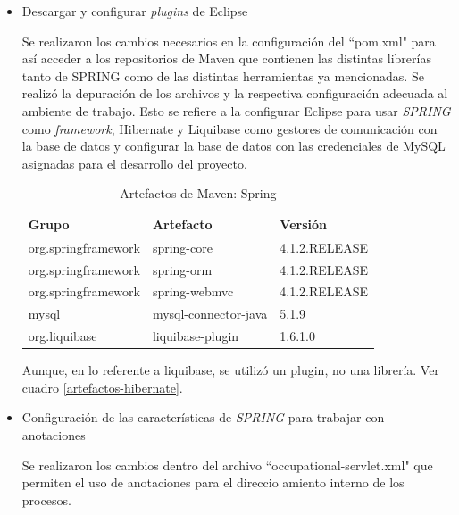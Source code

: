 \begin{enumerate}
\begin{itemize}
           \item Descargar y configurar \textit{plugins} de Eclipse
           
           Se realizaron los cambios necesarios en la configuración del ``pom.xml" para así acceder a los repositorios de Maven que contienen las distintas librerías tanto de SPRING como de las distintas herramientas ya mencionadas. Se realizó la depuración de los archivos y la respectiva configuración adecuada al ambiente de trabajo. Esto se refiere a la configurar Eclipse para usar \textit{SPRING} como \textit{framework}, Hibernate y Liquibase como gestores de comunicación con la base de datos y configurar la base de datos con las credenciales de MySQL asignadas para el desarrollo del proyecto.
           
           \begin{table}[h!]
               
               \begin{center}
                   \begin{tabular}{|l|l|l|}\hline
                       Grupo & Artefacto & Versión \\\hline
                       org.springframework & spring-core & 4.1.2.RELEASE \\\hline
                       org.springframework & spring-orm & 4.1.2.RELEASE \\\hline
                       org.springframework & spring-webmvc & 4.1.2.RELEASE \\\hline
                       mysql & mysql-connector-java & 5.1.9 \\\hline
                       org.liquibase & liquibase-plugin & 1.6.1.0 \\\hline
                    \end{tabular}
                \end{center}
                
                \caption{Artefactos de Maven: Spring}
                \label{artefactos-spring}
           \end{table}
            
           Aunque, en lo referente a liquibase, se utilizó un plugin, no una librería. Ver cuadro \ref{artefactos-hibernate}.
           
           \item Configuración de las características de \textit{SPRING} para trabajar con anotaciones
           
           Se realizaron los cambios dentro del archivo ``occupational-servlet.xml" que permiten el uso de anotaciones para el direccio amiento interno de los procesos.
           

\end{itemize}
\end{enumerate}
